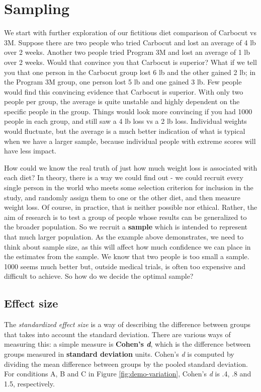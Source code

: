 \documentclass{krantz}
\begin{document}
\hypertarget{sampling}{%
\section{Sampling}\label{sampling}}

We start with further exploration of our fictitious diet comparison of Carbocut vs 3M. Suppose there are two people who tried Carbocut and lost an average of 4 lb over 2 weeks. Another two people tried Program 3M and lost an average of 1 lb over 2 weeks. Would that convince you that Carbocut is superior? What if we tell you that one person in the Carbocut group lost 6 lb and the other gained 2 lb; in the Program 3M group, one person lost 5 lb and one gained 3 lb. Few people would find this convincing evidence that Carbocut is superior. With only two people per group, the average is quite unstable and highly dependent on the specific people in the group. Things would look more convincing if you had 1000 people in each group, and still saw a 4 lb loss vs a 2 lb loss. Individual weights would fluctuate, but the average is a much better indication of what is typical when we have a larger sample, because individual people with extreme scores will have less impact.

How could we know the real truth of just how much weight loss is associated with each diet? In theory, there is a way we could find out - we could recruit every single person in the world who meets some selection criterion for inclusion in the study, and randomly assign them to one or the other diet, and then measure weight loss. Of course, in practice, that is neither possible nor ethical. Rather, the aim of research is to test a group of people whose results can be generalized to the broader population. So we recruit a \textbf{sample} which is intended to represent that much larger population. As the example above demonstrates, we need to think about sample size, as this will affect how much confidence we can place in the estimates from the sample. We know that two people is too small a sample. 1000 seems much better but, outside medical trials, is often too expensive and difficult to achieve. So how do we decide the optimal sample?

\hypertarget{effect-size}{%
\subsection{Effect size}\label{effect-size}}

The \emph{standardized effect size} is a way of describing the difference between groups that takes into account the standard deviation. There are various ways of measuring this: a simple measure is \textbf{Cohen's \emph{d}}, which is the difference between groups measured in \textbf{standard deviation} units. Cohen's \emph{d} is computed by dividing the mean difference between groups by the pooled standard deviation. For conditions A, B and C in Figure \ref{fig:demo-variation}, Cohen's \emph{d} is .4, .8 and 1.5, respectively.
\end{document}

